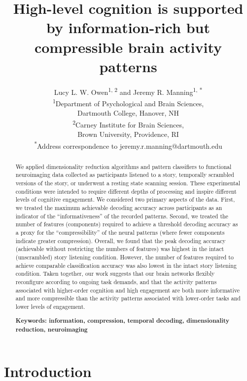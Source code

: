 \documentclass[english, 11pt]{article}
\title{High-level cognition is supported by information-rich but compressible brain activity patterns}
\author{Lucy L. W. Owen\textsuperscript{1, 2} and Jeremy R. Manning\textsuperscript{1,
*}\\\textsuperscript{1}Department of Psychological and Brain Sciences,\\Dartmouth College,
Hanover, NH\\[0.1cm]\textsuperscript{2}Carney Institute for Brain Sciences,\\Brown University,
Providence, RI\\[0.1cm] \textsuperscript{*}Address correspondence to
jeremy.r.manning@dartmouth.edu}
\begin{document}
\maketitle


\begin{abstract} 

We applied dimensionality reduction algorithms and pattern classifiers to
functional neuroimaging data collected as participants listened to a story,
temporally scrambled versions of the story, or underwent a resting state
scanning session. These experimental conditions were intended to require
different depths of processing and inspire different levels of cognitive
engagement. We considered two primary aspects of the data. First, we treated
the maximum achievable decoding accuracy across participants as an indicator of
the ``informativeness'' of the recorded patterns. Second, we treated the number
of features (components) required to achieve a threshold decoding accuracy as a
proxy for the ``compressibility'' of the neural patterns (where fewer
components indicate greater compression). Overall, we found that the peak
decoding accuracy (achievable without restricting the numbers of features)
was highest in the intact (unscrambled) story listening condition.  However, the
number of features required to achieve comparable classification accuracy
was also lowest in the intact story listening condition.  Taken together, our work
suggests that our brain networks flexibly reconfigure according to ongoing task
demands, and that the activity patterns associated with higher-order cognition
and high engagement are both more informative and more compressible than the
activity patterns associated with lower-order tasks and lower levels of
engagement.

\bigskip
\noindent
\textbf{Keywords: information, compression, temporal decoding, dimensionality
reduction, neuroimaging}

\end{abstract}

\doublespacing

\section*{Introduction}
\end{document}
